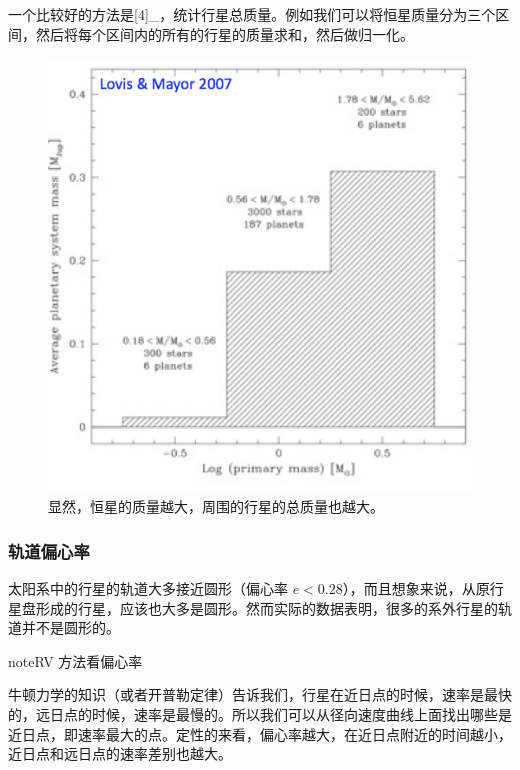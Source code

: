 \documentclass[letterpaper,10pt,english]{sphinxmanual}
\begin{document}
一个比较好的方法是{[}4{]}\_，统计行星总质量。例如我们可以将恒星质量分为三个区间，然后将每个区间内的所有的行星的质量求和，然后做归一化。
\begin{figure}[htbp]
\centering
\capstart

\includegraphics{3BinMassDist.png}
\caption{显然，恒星的质量越大，周围的行星的总质量也越大。}\end{figure}


\subsubsection{轨道偏心率}
\label{statistics:id14}
太阳系中的行星的轨道大多接近圆形（偏心率 \(e<0.28\)），而且想象来说，从原行星盘形成的行星，应该也大多是圆形。然而实际的数据表明，很多的系外行星的轨道并不是圆形的。

\begin{notice}{note}{RV 方法看偏心率}

牛顿力学的知识（或者开普勒定律）告诉我们，行星在近日点的时候，速率是最快的，远日点的时候，速率是最慢的。所以我们可以从径向速度曲线上面找出哪些是近日点，即速率最大的点。定性的来看，偏心率越大，在近日点附近的时间越小，近日点和远日点的速率差别也越大。
\end{notice}
\end{document}
